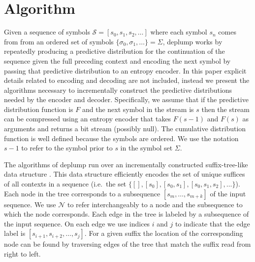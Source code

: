 \section{Algorithm}
\newcommand{\T}{\ensuremath{\mathcal{T}}}
\newcommand{\N}{\ensuremath{\mathcal{N}}}
\newcommand{\M}{\ensuremath{\mathcal{M}}}
\newcommand{\PP}{\ensuremath{\mathcal{P}}}
\newcommand{\nc}{\ensuremath{nc}}
\newcommand{\RS}{\ensuremath{\mathcal{R}\mathcal{S}}}
\newcommand{\D}{\ensuremath{\mathcal{D}}}
\newcommand{\la}{\ensuremath{\leftarrow}}
\newcommand{\G}{\ensuremath{\mathcal{G}}}
\newcommand{\IS}{\ensuremath{\mathcal{I}\mathcal{S}}}
\newcommand{\Seq}{\ensuremath{\mathcal{S}}}
\newcommand{\dd}{\ensuremath{\delta}}
%
%
Given a sequence of symbols $\Seq = [s_0, s_1, s_2, \ldots]$ where each symbol $s_n$ comes from from an ordered set of symbols $\{\sigma_0, \sigma_1, \ldots\} = \Sigma$,  deplump works by repeatedly producing a predictive distribution for the continuation of the sequence given the full preceding context and encoding the next symbol by passing that predictive distribution to an entropy encoder.  In this paper explicit details related to encoding and decoding are not included, instead we present the algorithms necessary to incrementally construct the predictive distributions needed by the encoder and decoder.  Specifically, we assume that if the predictive distribution function is $F$ and the next symbol in the stream is $s$ then the stream can be compressed using an entropy encoder that takes $F(s-1)$ and $F(s)$ as arguments and returns a bit stream (possibly null)\citep{Witten1987,arithmeticencoding}.   The cumulative distribution function is well defined because the symbols are ordered. We use the notation $s-1$ to refer to the symbol prior to $s$ in the symbol set $\Sigma$.  %

The algorithms of deplump run over an incrementally constructed suffix-tree-like data structure \citep{Ukkonen1992}. This data structure efficiently encodes the set of unique suffices of all contexts in a sequence (i.e.~the set $\{ [ ], [s_0], [s_0,s_1], [s_0, s_1,s_2], \ldots \}$).  Each node in the tree corresponds to a subsequence $[s_m, \ldots, s_{m + k}]$ of the input sequence.  We use $\N$ to refer interchangeably to a node and the subsequence to which the node corresponds.  Each edge in the tree is labeled by a subsequence of the input sequence.  On each edge we use indices $i$ and $j$ to indicate that the edge label is $[s_{i+1}, s_{i+2}, \ldots,s_{j}]$. For a given suffix the location of the corresponding node can be found by traversing edges of the tree that match the suffix read from right to left. 


